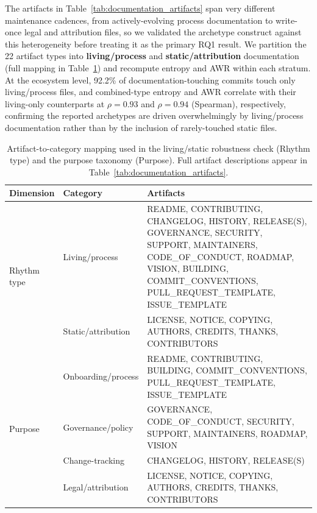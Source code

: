 \documentclass[10pt,conference]{IEEEtran}
\begin{document}
{{The artifacts in Table~\ref{tab:documentation_artifacts} span very different maintenance cadences, from actively-evolving process documentation to write-once legal and attribution files, so we validated the archetype construct against this heterogeneity before treating it as the primary RQ1 result. We partition the 22 artifact types into \textbf{living/process} and \textbf{static/attribution} documentation (full mapping in Table~\ref{tab:artifact_categories}) and recompute entropy and AWR within each stratum. At the ecosystem level, 92.2\% of documentation-touching commits touch only living/process files, and combined-type entropy and AWR correlate with their living-only counterparts at $\rho = 0.93$ and $\rho = 0.94$ (Spearman), respectively, confirming the reported archetypes are driven overwhelmingly by living/process documentation rather than by the inclusion of rarely-touched static files.

\begin{table}[t]
\centering
\small
\caption{Artifact-to-category mapping used in the living/static robustness check (Rhythm type) and the purpose taxonomy (Purpose). Full artifact descriptions appear in Table~\ref{tab:documentation_artifacts}.}
\label{tab:artifact_categories}
\setlength{\tabcolsep}{6pt}
\renewcommand{\arraystretch}{1.2}
\begin{tabular}{p{2.2cm}p{2.8cm}p{11.5cm}}
\toprule
\textbf{Dimension} & \textbf{Category} & \textbf{Artifacts} \\
\midrule
\multirow{2}{*}{Rhythm type}
 & Living/process & README, CONTRIBUTING, CHANGELOG, HISTORY, RELEASE(S), GOVERNANCE, SECURITY, SUPPORT, MAINTAINERS, CODE\_OF\_CONDUCT, ROADMAP, VISION, BUILDING, COMMIT\_CONVENTIONS, PULL\_REQUEST\_TEMPLATE, ISSUE\_TEMPLATE \\
 & Static/attribution & LICENSE, NOTICE, COPYING, AUTHORS, CREDITS, THANKS, CONTRIBUTORS \\
\midrule
\multirow{4}{*}{Purpose}
 & Onboarding/process & README, CONTRIBUTING, BUILDING, COMMIT\_CONVENTIONS, PULL\_REQUEST\_TEMPLATE, ISSUE\_TEMPLATE \\
 & Governance/policy & GOVERNANCE, CODE\_OF\_CONDUCT, SECURITY, SUPPORT, MAINTAINERS, ROADMAP, VISION \\
 & Change-tracking & CHANGELOG, HISTORY, RELEASE(S) \\
 & Legal/attribution & LICENSE, NOTICE, COPYING, AUTHORS, CREDITS, THANKS, CONTRIBUTORS \\
\bottomrule
\end{tabular}
\end{table}

}}
\end{document}
